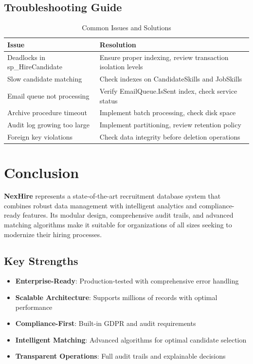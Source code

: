 \documentclass[11pt,a4paper]{article}
\begin{document}
\subsection{Troubleshooting Guide}
\begin{table}[H]
    \centering
    \begin{tabular}{|p{3cm}|p{9cm}|}
        \hline
        \rowcolor{tableheader}
        \textbf{Issue} & \textbf{Resolution} \\
        \hline
        Deadlocks in sp\_HireCandidate & Ensure proper indexing, review transaction isolation levels \\
        \hline
        Slow candidate matching & Check indexes on CandidateSkills and JobSkills \\
        \hline
        Email queue not processing & Verify EmailQueue.IsSent index, check service status \\
        \hline
        Archive procedure timeout & Implement batch processing, check disk space \\
        \hline
        Audit log growing too large & Implement partitioning, review retention policy \\
        \hline
        Foreign key violations & Check data integrity before deletion operations \\
        \hline
    \end{tabular}
    \caption{Common Issues and Solutions}
\end{table}


\section{Conclusion}


    \textbf{NexHire} represents a state-of-the-art recruitment database system that combines robust data management with intelligent analytics and compliance-ready features. Its modular design, comprehensive audit trails, and advanced matching algorithms make it suitable for organizations of all sizes seeking to modernize their hiring processes.


\subsection{Key Strengths}
\begin{itemize}
    \item \textbf{Enterprise-Ready}: Production-tested with comprehensive error handling
    \item \textbf{Scalable Architecture}: Supports millions of records with optimal performance
    \item \textbf{Compliance-First}: Built-in GDPR and audit requirements
    \item \textbf{Intelligent Matching}: Advanced algorithms for optimal candidate selection
    \item \textbf{Transparent Operations}: Full audit trails and explainable decisions
\end{itemize}
\end{document}
